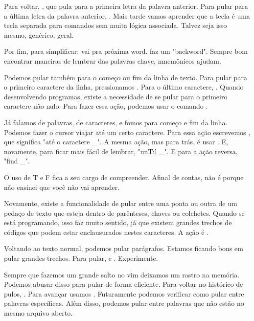 Para voltar, , que pula para a primeira letra da palavra anterior.
Para pular para a última letra da palavra anterior, .
Mais tarde vamos aprender que a tecla  é uma tecla separada para comandos sem muita lógica associada.
Talvez seja isso mesmo, genérico, geral.

Por fim, para simplificar:  vai pra próxima word.  faz um "backword".
Sempre bom encontrar maneiras de lembrar das palavras chave, mnemônicos ajudam.


Podemos pular também para o começo ou fim da linha de texto.
Para pular para o primeiro caractere da linha, pressionamos .
Para o último caractere, \vimcommand{\$}.
Quando desenvolvendo programas, existe a necessidade de se pular para o primeiro caractere não nulo.
Para fazer essa ação, podemos usar o comando \vimcommand{\^}.

Já falamos de palavras, de caracteres, e fomos para começo e fim da linha.
Podemos fazer o cursor viajar até um certo caractere.
Para essa ação escrevemos , que significa "até o caractere \_".
A mesma ação, mas para trás, é usar .
E, novamente, para ficar mais fácil de lembrar, "unTil \_".
E para a ação reversa, "find \_".

O uso de T e F fica a seu cargo de compreender.
Afinal de contas, não é porque não ensinei que você não vai aprender.


Novamente, existe a funcionalidade de pular entre uma ponta ou outra de um pedaço de
texto que esteja dentro de parênteses, chaves ou colchetes.
Quando se está programando, isso faz muito sentido, já que existem grandes trechos de
códigos que podem estar enclausurados nestes caracteres.
A ação é \vimcommand{\%}.


Voltando ao texto normal, podemos pular parágrafos.
Estamos ficando bons em pular grandes trechos.
Para pular, \vimcommand{\{} e \vimcommand{\}}. Experimente.


Sempre que fazemos um grande salto no vim deixamos um rastro na memória.
Podemos abusar disso para pular de forma eficiente.
Para voltar no histórico de pulos, .
Para avançar usamos .
Futuramente podemos verificar como pular entre palavras específicas.
Além disso, podemos pular entre palavras que não estão no mesmo arquivo aberto.

